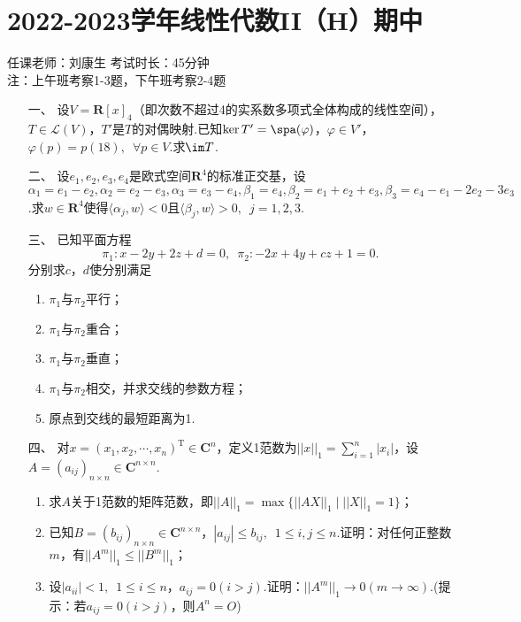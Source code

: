 \section*{2022-2023学年线性代数II（H）期中}

\begin{center}
    任课老师：刘康生\hspace{4em} 考试时长：45分钟 \\
    注：上午班考察1-3题，下午班考察2-4题
\end{center}

\begin{enumerate}
	\item[一、]设$V=\mathbf{R}[x]_4$（即次数不超过4的实系数多项式全体构成的线性空间），$T\in\mathcal{L}(V)$，$T'$是$T$的对偶映射.已知$\ker T'=\spa(\varphi)$，$\varphi\in V'$，$\varphi(p)=p(18),\enspace\forall p\in V$.求$\im T$.
	\item[二、]设$e_1,e_2,e_3,e_4$是欧式空间$\mathbf{R}^4$的标准正交基，设$\alpha_1=e_1-e_2,\alpha_2=e_2-e_3,\alpha_3=e_3-e_4,\beta_1=e_4,\beta_2=e_1+e_2+e_3,\beta_3=e_4-e_1-2e_2-3e_3$.求$w\in\mathbf{R}^4$使得$\langle\alpha_j,w\rangle<0$且$\langle\beta_j,w\rangle>0,\enspace j=1,2,3$.
	\item[三、]已知平面方程
    \[\pi_1:x-2y+2z+d=0,\enspace \pi_2:-2x+4y+cz+1=0.\]
    分别求$c$，$d$使分别满足
    \begin{enumerate}[label=(\arabic*)]
        \item $\pi_1$与$\pi_2$平行；
        \item $\pi_1$与$\pi_2$重合；
        \item $\pi_1$与$\pi_2$垂直；
        \item $\pi_1$与$\pi_2$相交，并求交线的参数方程；
        \item 原点到交线的最短距离为1.
    \end{enumerate}
	\item[四、]对$x=(x_1,x_2,\cdots,x_n)^\mathrm{T}\in\mathbf{C}^n$，定义1范数为$||x||_1=\sum\limits_{i=1}^n|x_i|$，设$A=(a_{ij})_{n\times n}\in\mathbf{C}^{n\times n}$.
	\begin{enumerate}[label=(\arabic*)]
        \item 求$A$关于1范数的矩阵范数，即$||A||_1=\max\{||AX||_1\mid ||X||_1=1\}$；
        \item 已知$B=(b_{ij})_{n\times n}\in\mathbf{C}^{n\times n}$，$|a_{ij}|\le b_{ij},\enspace 1\leqslant i,j\leqslant n$.证明：对任何正整数$m$，有$||A^m||_1\leqslant||B^m||_1$；
        \item 设$|a_{ii}|<1,\enspace 1\leqslant i\leqslant n$，$a_{ij}=0(i>j)$.证明：$||A^m||_1\to 0(m\to\infty)$.(提示：若$a_{ij}=0(i>j)$，则$A^n=O$)
    \end{enumerate}
\end{enumerate}

\clearpage
